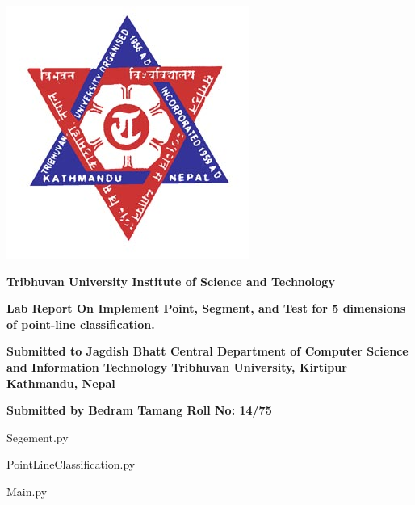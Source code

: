 \documentclass[14pt]{extreport}
\begin{document}
\begin{center}
\includegraphics[scale=0.5]{logo.jpg}
\end{center}

\begin{center}
\textbf{
Tribhuvan University
\linebreak
Institute of Science and Technology 
}
\end{center}


\begin{center}
\vspace{2cm}
\textbf{
Lab Report
\linebreak
On
\linebreak
Implement Point, Segment, and Test for 5 dimensions of point-line classification.  
}
\end{center}

\begin{center}
\vspace{3cm}
\textbf{
Submitted to 
\linebreak
Jagdish Bhatt
\linebreak
Central Department of Computer Science and Information Technology
\linebreak
Tribhuvan University, Kirtipur
Kathmandu, Nepal
}
\end{center}

\begin{center}
\vspace{3cm}
\textbf{
Submitted by
\linebreak
Bedram Tamang
\linebreak
Roll No: 14/75
}
\end{center}


\clearpage


Segement.py

PointLineClassification.py

Main.py

\end{document}
